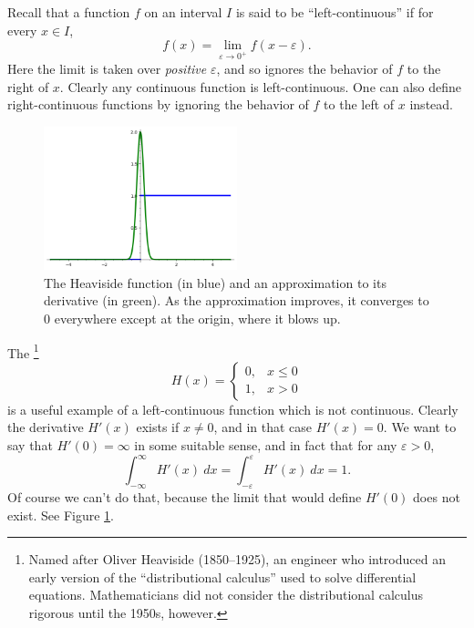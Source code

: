 \begin{subsec}
Recall that a function $f$ on an interval $I$ is said to be ``left-continuous'' if for every $x \in I$,
\[f(x) = \lim_{\varepsilon \to 0^+} f(x - \varepsilon).\]
Here the limit is taken over \emph{positive} $\varepsilon$, and so ignores the behavior of $f$ to the right of $x$.
Clearly any continuous function is left-continuous.
One can also define right-continuous functions by ignoring the behavior of $f$ to the left of $x$ instead.
\end{subsec}

\begin{figure}
\label{Heaviside figure}
\caption{The Heaviside function (in blue) and an approximation to its derivative (in green).
As the approximation improves, it converges to $0$ everywhere except at the origin, where it blows up.}
\centering \includegraphics[width=0.5\textwidth]{graphics/heaviside}
\end{figure}

\begin{example}
The \footnote{Named after Oliver Heaviside (1850--1925), an engineer who introduced an early version of the ``distributional calculus'' used to solve differential equations. Mathematicians did not consider the distributional calculus rigorous until the 1950s, however.}
\[H(x) = \begin{cases}
0, & x \leq 0\\
1, & x > 0
\end{cases}\]
is a useful example of a left-continuous function which is not continuous.
Clearly the derivative $H'(x)$ exists if $x \neq 0$, and in that case $H'(x) = 0$.
We want to say that $H'(0) = \infty$ in some suitable sense, and in fact that for any $\varepsilon > 0$,
\[\int_{-\infty}^{\infty} H'(x)~dx = \int_{-\varepsilon}^{\varepsilon} H'(x)~dx = 1.\]
Of course we can't do that, because the limit that would define $H'(0)$ does not exist.
See Figure \ref{Heaviside figure}.
\end{example}


